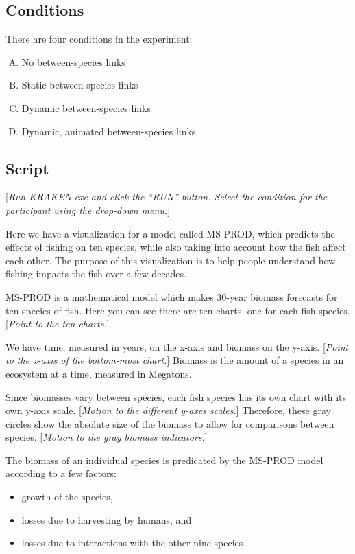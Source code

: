 {{{\subsection{Conditions}

There are four conditions in the experiment:

\begin{enumerate}[(A)]
\item No between-species links
\item Static between-species links
\item Dynamic between-species links
\item Dynamic, animated between-species links
\end{enumerate}

\subsection{Script}

[\textit{Run KRAKEN.exe and click the ``RUN'' button. Select the condition for the participant using the drop-down menu.}]

Here we have a visualization for a model called MS-PROD, which predicts the effects of fishing on ten species, while also taking into account how the fish affect each other.  The purpose of this visualization is to help people understand how fishing impacts the fish over a few decades.

MS-PROD is a mathematical model which makes 30-year biomass forecasts for ten species of fish.  Here you can see there are ten charts, one for each fish species.  [\textit{Point to the ten charts.}]

We have time, measured in years, on the x-axis and biomass on the y-axis.  [\textit{Point to the x-axis of the bottom-most chart.}]  Biomass is the amount of a species in an ecosystem at a time, measured in Megatons.

Since biomasses vary between species, each fish species has its own chart with its own y-axis scale.  [\textit{Motion to the different y-axes scales.}]  Therefore, these gray circles show the absolute size of the biomass to allow for comparisons between species.  [\textit{Motion to the gray biomass indicators.}]

The biomass of an individual species is predicated by the MS-PROD model according to a few factors:

\begin{itemize}
\item growth of the species,
\item losses due to harvesting by humans, and
\item losses due to interactions with the other nine species
\end{itemize}

}}}
